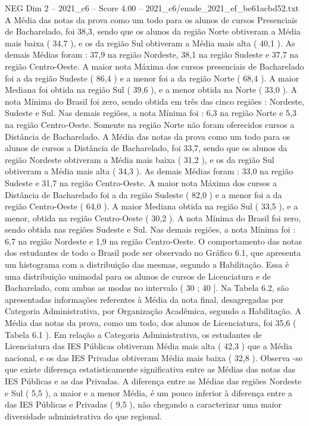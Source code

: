 \begin{textsample}{NEG Dim 2 – 2021\_c6 – Score 4.00 – 2021\_c6/enade\_2021\_ef\_be61acbd52.txt}
A Média das notas da prova como um todo para os alunos de cursos Presenciais de Bacharelado, foi 38,3, sendo que os alunos da região Norte obtiveram a Média mais baixa ( 34,7 ), e os da região Sul obtiveram a Média mais alta ( 40,1 ).
As demais Médias foram : 37,9 na região Nordeste, 38,1 na região Sudeste e 37,7 na região Centro-Oeste.
A maior nota Máxima dos cursos presenciais de Bacharelado foi a da região Sudeste ( 86,4 ) e a menor foi a da região Norte ( 68,4 ).
A maior Mediana foi obtida na região Sul ( 39,6 ), e a menor obtida na Norte ( 33,0 ).
A nota Mínima do Brasil foi zero, sendo obtida em três das cinco regiões : Nordeste, Sudeste e Sul.
Nas demais regiões, a nota Mínima foi : 6,3 na região Norte e 5,3 na região Centro-Oeste.
Somente na região Norte não foram oferecidos cursos a Distância de Bacharelado.
A Média das notas da prova como um todo para os alunos de cursos a Distância de Bacharelado, foi 33,7, sendo que os alunos da região Nordeste obtiveram a Média mais baixa ( 31,2 ), e os da região Sul obtiveram a Média mais alta ( 34,3 ).
As demais Médias foram : 33,0 na região Sudeste e 31,7 na região Centro-Oeste.
A maior nota Máxima dos cursos a Distância de Bacharelado foi a da região Sudeste ( 82,0 ) e a menor foi a da região Centro-Oeste ( 64,0 ).
A maior Mediana obtida na região Sul ( 33,5 ), e a menor, obtida na região Centro-Oeste ( 30,2 ).
A nota Mínima do Brasil foi zero, sendo obtida nas regiões Sudeste e Sul.
Nas demais regiões, a nota Mínima foi : 6,7 na região Nordeste e 1,9 na região Centro-Oeste.
O comportamento das notas dos estudantes de todo o Brasil pode ser observado no Gráfico 6.1, que apresenta um histograma com a distribuição das mesmas, segundo a Habilitação.
Essa é uma distribuição unimodal para os alunos de cursos de Licenciatura e de Bacharelado, com ambas as modas no intervalo ( 30 ; 40 ].
Na Tabela 6.2, são apresentadas informações referentes à Média da nota final, desagregadas por Categoria Administrativa, por Organização Acadêmica, segundo a Habilitação.
A Média das notas da prova, como um todo, dos alunos de Licenciatura, foi 35,6 ( Tabela 6.1 ).
Em relação a Categoria Administrativa, os estudantes de Licenciatura das IES Públicas obtiveram Média mais alta ( 42,3 ) que a Média nacional, e os das IES Privadas obtiveram Média mais baixa ( 32,8 ).
Observa -se que existe diferença estatisticamente significativa entre as Médias das notas das IES Públicas e as das Privadas.
A diferença entre as Médias das regiões Nordeste e Sul ( 5,5 ), a maior e a menor Média, é um pouco inferior à diferença entre a das IES Públicas e Privadas ( 9,5 ), não chegando a caracterizar uma maior diversidade administrativa do que regional.

\end{textsample}

